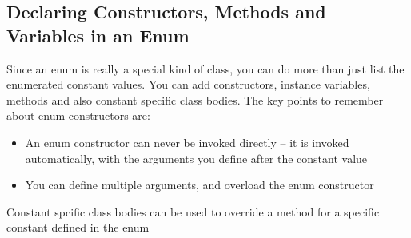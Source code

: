 \subsection{Declaring Constructors, Methods and Variables in an Enum}
Since an enum is really a special kind of class, you can do more than just list 
the enumerated constant values. You can add constructors, instance variables, 
methods and also constant specific class bodies. The key points to remember 
about enum constructors are:
\begin{itemize}
    \item An enum constructor can never be invoked directly -- it is invoked 
    automatically, with the arguments you define after the constant value
    \item You can define multiple arguments, and overload the enum constructor
\end{itemize}
Constant spcific class bodies can be used to override a method for a specific 
constant defined in the enum
